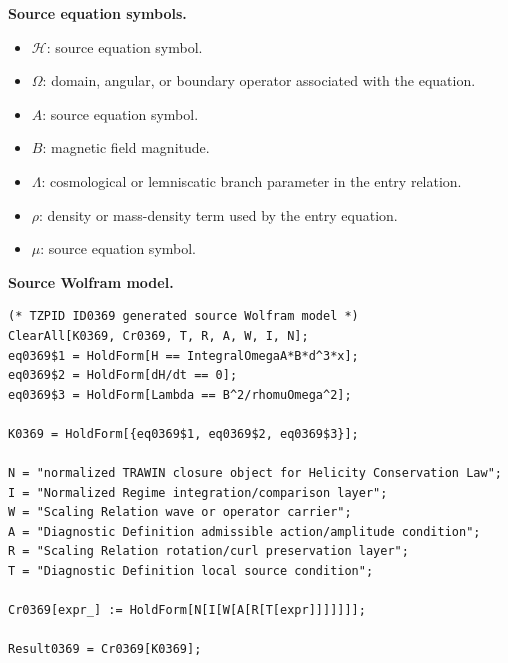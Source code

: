 \begin{minipage}[t]{0.49\linewidth}
\begingroup
\small
\raggedright
\textbf{Source equation symbols.}\par
\begin{itemize}[leftmargin=1.35em,itemsep=1pt,topsep=1pt,parsep=0pt]
    \item $\mathcal{H}$: source equation symbol.
    \item $\Omega$: domain, angular, or boundary operator associated with the equation.
    \item $A$: source equation symbol.
    \item $B$: magnetic field magnitude.
    \item $\Lambda$: cosmological or lemniscatic branch parameter in the entry relation.
    \item $\rho$: density or mass-density term used by the entry equation.
    \item $\mu$: source equation symbol.
\end{itemize}
\endgroup
\end{minipage}\hfill
\begin{minipage}[t]{0.47\linewidth}
\begingroup
\scriptsize
\raggedright
\textbf{Source Wolfram model.}\par
\begin{Verbatim}[fontsize=\tiny,breaklines=true,breakanywhere=true]
(* TZPID ID0369 generated source Wolfram model *)
ClearAll[K0369, Cr0369, T, R, A, W, I, N];
eq0369$1 = HoldForm[H == IntegralOmegaA*B*d^3*x];
eq0369$2 = HoldForm[dH/dt == 0];
eq0369$3 = HoldForm[Lambda == B^2/rhomuOmega^2];

K0369 = HoldForm[{eq0369$1, eq0369$2, eq0369$3}];

N = "normalized TRAWIN closure object for Helicity Conservation Law";
I = "Normalized Regime integration/comparison layer";
W = "Scaling Relation wave or operator carrier";
A = "Diagnostic Definition admissible action/amplitude condition";
R = "Scaling Relation rotation/curl preservation layer";
T = "Diagnostic Definition local source condition";

Cr0369[expr_] := HoldForm[N[I[W[A[R[T[expr]]]]]]];

Result0369 = Cr0369[K0369];
\end{Verbatim}
\endgroup
\end{minipage}

